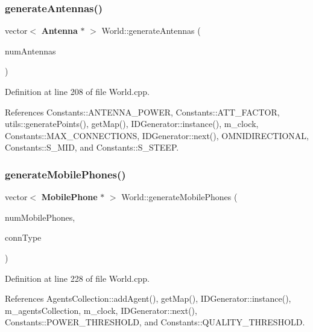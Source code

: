 \mbox{\label{class_world_a6cb3aa7d814b3d6302ea984889179eac}} 
\subsubsection{generateAntennas()}
{\footnotesize\ttfamily vector$<$ \textbf{ Antenna} $\ast$ $>$ World\+::generate\+Antennas (\begin{DoxyParamCaption}\item[{unsigned long}]{num\+Antennas }\end{DoxyParamCaption})\hspace{0.3cm}{\ttfamily [private]}}



Definition at line 208 of file World.\+cpp.



References Constants\+::\+A\+N\+T\+E\+N\+N\+A\+\_\+\+P\+O\+W\+ER, Constants\+::\+A\+T\+T\+\_\+\+F\+A\+C\+T\+OR, utils\+::generate\+Points(), get\+Map(), I\+D\+Generator\+::instance(), m\+\_\+clock, Constants\+::\+M\+A\+X\+\_\+\+C\+O\+N\+N\+E\+C\+T\+I\+O\+NS, I\+D\+Generator\+::next(), O\+M\+N\+I\+D\+I\+R\+E\+C\+T\+I\+O\+N\+AL, Constants\+::\+S\+\_\+\+M\+ID, and Constants\+::\+S\+\_\+\+S\+T\+E\+EP.

\mbox{\label{class_world_a478f62a296d9a7b6587c116aab6563c6}} 
\subsubsection{generateMobilePhones()}
{\footnotesize\ttfamily vector$<$ \textbf{ Mobile\+Phone} $\ast$ $>$ World\+::generate\+Mobile\+Phones (\begin{DoxyParamCaption}\item[{int}]{num\+Mobile\+Phones,  }\item[{\textbf{ Holdable\+Agent\+::\+C\+O\+N\+N\+E\+C\+T\+I\+O\+N\+\_\+\+T\+Y\+PE}}]{conn\+Type }\end{DoxyParamCaption})\hspace{0.3cm}{\ttfamily [private]}}



Definition at line 228 of file World.\+cpp.



References Agents\+Collection\+::add\+Agent(), get\+Map(), I\+D\+Generator\+::instance(), m\+\_\+agents\+Collection, m\+\_\+clock, I\+D\+Generator\+::next(), Constants\+::\+P\+O\+W\+E\+R\+\_\+\+T\+H\+R\+E\+S\+H\+O\+LD, and Constants\+::\+Q\+U\+A\+L\+I\+T\+Y\+\_\+\+T\+H\+R\+E\+S\+H\+O\+LD.



